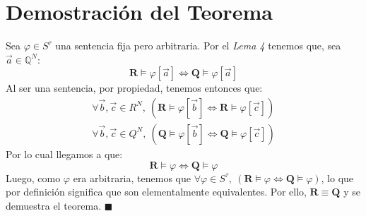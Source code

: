 \documentclass{article}
\begin{document}
\section*{Demostración del Teorema}
Sea $\varphi\in S^\tau$ una sentencia fija pero arbitraria. Por el \textit{Lema 4} tenemos que, sea $\vec{a}\in\mathbb{Q}^N$:
\begin{equation*}
  \mathbf{R}\vDash\varphi[\vec{a}]\iff\mathbf{Q}\vDash\varphi[\vec{a}]
\end{equation*}
Al ser una sentencia, por propiedad, tenemos entonces que:
\begin{equation*}
  \begin{aligned}
    \forall\vec{b},\vec{c}\in R^N,\ (\mathbf{R}\vDash\varphi[\vec{b}]\iff\mathbf{R}\vDash\varphi[\vec{c}]) \\
    \forall\vec{b},\vec{c}\in Q^N,\ (\mathbf{Q}\vDash\varphi[\vec{b}]\iff\mathbf{Q}\vDash\varphi[\vec{c}])
  \end{aligned}
\end{equation*}
Por lo cual llegamos a que:
\begin{equation*}
  \mathbf{R}\vDash\varphi\iff\mathbf{Q}\vDash\varphi
\end{equation*}
Luego, como $\varphi$ era arbitraria, tenemos que $\forall\varphi\in S^\tau,\ (\mathbf{R}\vDash\varphi\iff\mathbf{Q}\vDash\varphi)$, lo que por definición significa que son elementalmente equivalentes.
Por ello, $\mathbf{R}\equiv\mathbf{Q}$ y se demuestra el teorema. $\blacksquare$
\end{document}
